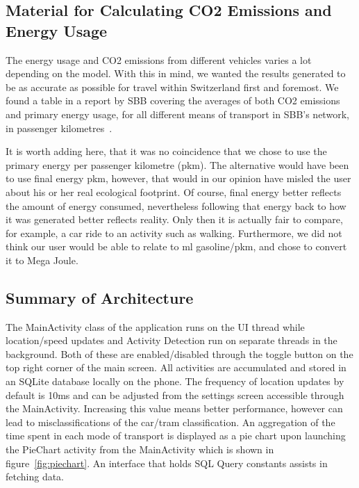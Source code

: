 \documentclass[10pt,conference,compsocconf]{IEEEtran}
\begin{document}
\subsection{Material for Calculating CO2 Emissions and Energy Usage}

The energy usage and CO2 emissions from different vehicles varies a lot depending on the model. With this in mind, we wanted the results generated to be as accurate as possible for travel within Switzerland first and foremost. We found a table in a report by SBB covering the averages of both CO2 emissions and primary energy usage, for all different means of transport in SBB’s network, in passenger kilometres~\cite{sbbcalculator2017}.

It is worth adding here, that it was no coincidence that we chose to use the primary energy per passenger kilometre (pkm). The alternative would have been to use final energy pkm, however, that would in our opinion have misled the user about his or her real ecological footprint. Of course, final energy better reflects the amount of energy consumed, nevertheless following that energy back to how it was generated better reflects reality. Only then it is actually fair to compare, for example, a car ride to an activity such as walking. 
Furthermore, we did not think our user would be able to relate to ml gasoline/pkm, and chose to convert it to Mega Joule. 


\subsection{Summary of Architecture}

The MainActivity class of the application runs on the UI thread while location/speed updates and Activity Detection run on separate threads in the background. Both of these are enabled/disabled through the toggle button on the top right corner of the main screen. All activities are accumulated and stored in an SQLite database locally on the phone. The frequency of location updates by default is 10ms and can be adjusted from the settings screen accessible through the MainActivity. Increasing this value means better performance, however can lead to misclassifications of the car/tram classification. An aggregation of the time spent in each mode of transport is displayed as a pie chart upon launching the PieChart activity from the MainActivity which is shown in figure~\ref{fig:piechart}. An interface that holds SQL Query constants assists in fetching data.
\end{document}
